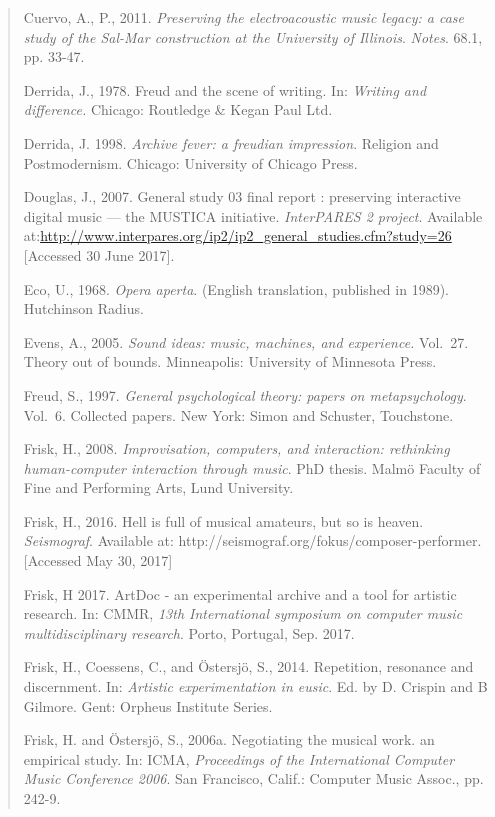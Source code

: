\begin{quote}
Cuervo, A., P., 2011. \emph{Preserving the electroacoustic music legacy:
a case study of the Sal-Mar construction at the University of Illinois}.
\emph{Notes}. 68.1, pp. 33-47.

Derrida, J., 1978. Freud and the scene of writing. In: \emph{Writing and
difference.} Chicago: Routledge \& Kegan Paul Ltd.

Derrida, J. 1998. \emph{Archive fever: a freudian impression}. Religion
and Postmodernism. Chicago: University of Chicago Press.

Douglas, J., 2007. General study 03 final report : preserving
interactive digital music --- the MUSTICA initiative. \emph{InterPARES 2
project}. Available
at:\href{http://www.interpares.org/ip2/ip2_general_studies.cfm?study=26}{{http://www.interpares.org/ip2/ip2\_general\_studies.cfm?study=26}}
{[}Accessed 30 June 2017{]}.

Eco, U., 1968. \emph{Opera aperta}. (English translation, published in
1989). Hutchinson Radius.

Evens, A., 2005. \emph{Sound ideas: music, machines, and experience.}
Vol.~27. Theory out of bounds. Minneapolis: University of Minnesota
Press.

Freud, S., 1997. \emph{General psychological theory: papers on
metapsychology}. Vol.~6. Collected papers. New York: Simon and Schuster,
Touchstone.

Frisk, H., 2008. \emph{Improvisation, computers, and interaction:
rethinking human-computer interaction through music}. PhD thesis. Malmö
Faculty of Fine and Performing Arts, Lund University.

Frisk, H., 2016. Hell is full of musical amateurs, but so is heaven.
\emph{Seismograf}. Available at:
http://seismograf.org/fokus/composer-performer. {[}Accessed May 30,
2017{]}

Frisk, H 2017. ArtDoc - an experimental archive and a tool for artistic
research. In: CMMR, \emph{13th International symposium on computer music
multidisciplinary research}. Porto, Portugal, Sep. 2017.

Frisk, H., Coessens, C., and Östersjö, S., 2014. Repetition, resonance
and discernment. In: \emph{Artistic experimentation in eusic}. Ed. by D.
Crispin and B Gilmore. Gent: Orpheus Institute Series.

Frisk, H. and Östersjö, S., 2006a. Negotiating the musical work. an
empirical study. In: ICMA, \emph{Proceedings of the International
Computer Music Conference 2006}. San Francisco, Calif.: Computer Music
Assoc., pp. 242-9.


\end{quote}
